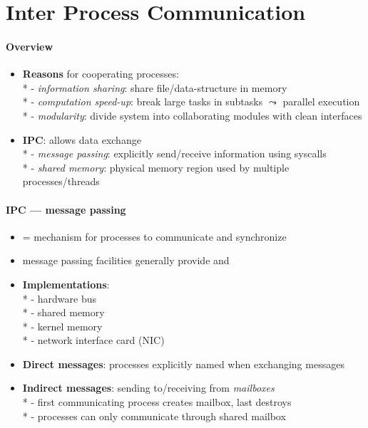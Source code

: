 \section{Inter Process Communication}

\paragraph{Overview}
\begin{itemize}
  \item \textbf{Reasons} for cooperating processes: \\*
    - \emph{information sharing}: share file/data-structure in memory \\*
    - \emph{computation speed-up}: break large tasks in subtasks \( \leadsto \) parallel execution \\*
    - \emph{modularity}: divide system into collaborating modules with clean interfaces
  \item \textbf{IPC}: allows data exchange \\*
    - \emph{message passing}: explicitly send/receive information using syscalls \\*
    - \emph{shared memory}: physical memory region used by multiple processes/threads
\end{itemize}

\paragraph{IPC --- message passing}
\begin{itemize}
  \item = mechanism for processes to communicate and synchronize
  \item message passing facilities generally provide  and 
  \item \textbf{Implementations}: \\*
    - hardware bus \\*
    - shared memory \\*
    - kernel memory \\*
    - network interface card (NIC)
  \item \textbf{Direct messages}: processes explicitly named when exchanging messages
  \item \textbf{Indirect messages}: sending to/receiving from \emph{mailboxes} \\*
    - first communicating process creates mailbox, last destroys \\*
    - processes can only communicate through shared mailbox
\end{itemize}

